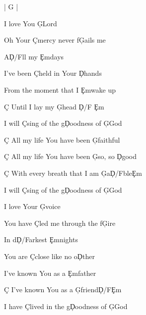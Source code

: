 \documentclass[9pt]{extarticle}
\begin{document}
\bsong

\bi[2]
| G |
\ei

\bv
I love You \c{G}Lord

Oh Your \c{C}mercy never f\c{G}ails me

A\c{D/F\s }ll my \c{Em}days

I've been \c{C}held in Your \c{D}hands

From the moment that I \c{Em}wake up

\c{C} Until I lay my \c{G}head \c{D/F\s } \c{Em}

I will \c{C}sing of the g\c{D}oodness of \c{G}God
\ev

\bc
\c{C} All my life You have been \c{G}faithful

\c{C} All my life You have been \c{G}so, so \c{D}good

\c{C} With every breath that I am \c{G}a\c{D/F\s }ble\c{Em}

I will \c{C}sing of the g\c{D}oodness of \c{G}God
\ec

\bv
I love Your \c{G}voice

You have \c{C}led me through the f\c{G}ire

In d\c{D/F\s }arkest \c{Em}nights

You are \c{C}close like no o\c{D}ther

I've known You as a \c{Em}father

\c{C} I've known You as a \c{G}friend\c{D/F\s }\c{Em}

I have \c{C}lived in the g\c{D}oodness of \c{G}God
\ev


\bb[2]



\eb


\esong
\end{document}
